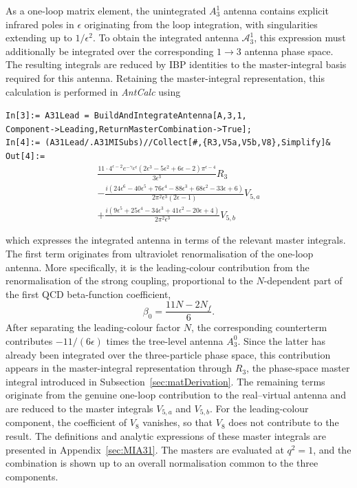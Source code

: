 As a one-loop matrix element, the unintegrated $A_3^1$ antenna contains explicit
infrared poles in $\epsilon$ originating from the loop integration, with
singularities extending up to $1/\epsilon^2$. To obtain the integrated antenna
$\mathcal A_3^1$, this expression must additionally be integrated over the
corresponding $1\to3$ antenna phase space. The resulting integrals are reduced by IBP
identities to the master-integral basis required for this antenna. Retaining the
master-integral representation, this calculation is performed in \textit{AntCalc}
using

\begin{mdframed}[backgroundcolor=gray!10, linewidth=0pt]
\texttt{In[3]:= A31Lead = BuildAndIntegrateAntenna[A,3,1,\\Component->Leading,ReturnMasterCombination->True];}\\
\texttt{In[4]:= (A31Lead/.A31MISubs)//Collect[\#,\{R3,V5a,V5b,V8\},Simplify]\&}\\
\hfill
\texttt{Out[4]:=}
    \begin{equation*}
        \begin{gathered}
            \frac{11\cdot4^{\epsilon-2}e^{-\gamma_E\epsilon}\left(2\epsilon^3-5\epsilon^2+6\epsilon-2\right)\pi^{\epsilon-4}}{3\epsilon^3}R_3\\
            -\frac{i\left(24\epsilon^6-40\epsilon^5+76\epsilon^4-88\epsilon^3+68\epsilon^2-33\epsilon+6\right)}{2\pi^2\epsilon^3(2\epsilon-1)}V_{5,a}\\
            +\frac{i\left(9\epsilon^5+25\epsilon^4-34\epsilon^3+41\epsilon^2-20\epsilon+4\right)}{2\pi^2\epsilon^3}V_{5,b}
        \end{gathered}
    \end{equation*}
\end{mdframed}

which expresses the integrated antenna in terms of the relevant master integrals. The first term
originates from ultraviolet renormalisation of the one-loop antenna. More specifically, it is the
leading-colour contribution from the renormalisation of the strong coupling, proportional to the
$N$-dependent part of the first QCD beta-function coefficient,
\begin{equation*}
    \beta_0=\frac{11N-2N_f}{6}.
\end{equation*}
After separating the leading-colour factor $N$, the corresponding counterterm contributes
$-11/(6\epsilon)$ times the tree-level antenna $A_3^0$. Since the latter has already been integrated
over the three-particle phase space, this contribution appears in the master-integral representation
through $R_3$, the phase-space master integral introduced in Subsection~\ref{sec:matDerivation}. The
remaining terms originate from the genuine one-loop contribution to the real--virtual antenna and are
reduced to the master integrals $V_{5,a}$ and $V_{5,b}$. For the leading-colour component, the
coefficient of $V_8$ vanishes, so that $V_8$ does not contribute to the result. The definitions and analytic
expressions of these master integrals are presented in Appendix~\ref{sec:MIA31}. The masters are
evaluated at $q^2=1$, and the combination is shown up to an overall normalisation common to the three
components.

